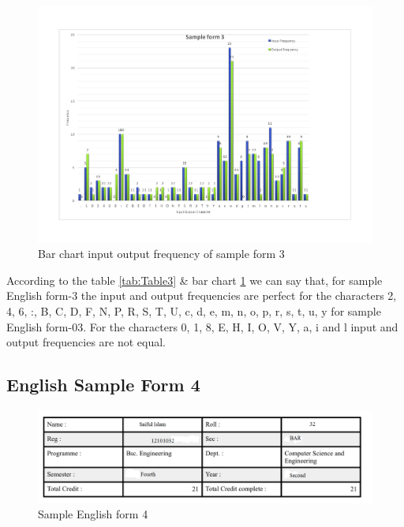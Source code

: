 \begin{figure}[H]
\centering
\includegraphics[width=1\textwidth]{form3.pdf}
\caption {Bar chart input output frequency of sample form 3}
\label {fig:bar3}
\end{figure}
According to the table \ref{tab:Table3} \& bar chart \ref{fig:bar3} we can say that, for sample English form-3 the input and output frequencies are perfect for the characters 2, 4, 6, :, B, C, D, F, N, P, R, S, T, U, c, d, e, m, n, o, p, r, s, t, u, y for sample English form-03. For the characters 0, 1, 8, E, H, I, O, V, Y, a, i and l input and output frequencies are not equal. 

\subsection{English Sample Form 4}

\begin{figure}[H]
\centering
\includegraphics[width=1\textwidth]{form4.png}
\caption {Sample English form 4}
\label {fig:form4}
\end{figure}

